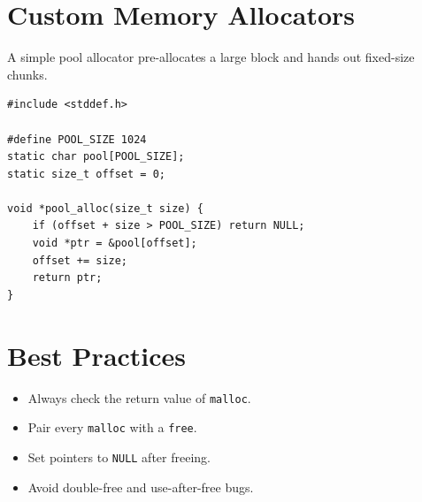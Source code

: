 \documentclass[11pt,a4paper]{article}
\begin{document}
\section{Custom Memory Allocators}
A simple pool allocator pre-allocates a large block and hands out fixed-size chunks.

\begin{lstlisting}
#include <stddef.h>

#define POOL_SIZE 1024
static char pool[POOL_SIZE];
static size_t offset = 0;

void *pool_alloc(size_t size) {
    if (offset + size > POOL_SIZE) return NULL;
    void *ptr = &pool[offset];
    offset += size;
    return ptr;
}
\end{lstlisting}

\section{Best Practices}
\begin{itemize}
  \item Always check the return value of \texttt{malloc}.
  \item Pair every \texttt{malloc} with a \texttt{free}.
  \item Set pointers to \texttt{NULL} after freeing.
  \item Avoid double-free and use-after-free bugs.
\end{itemize}
\end{document}
